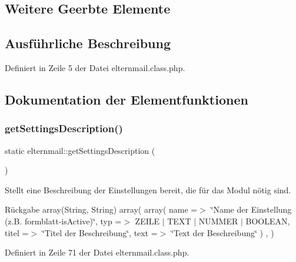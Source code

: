 \subsection*{Weitere Geerbte Elemente}


\subsection{Ausführliche Beschreibung}


Definiert in Zeile 5 der Datei elternmail.\+class.\+php.



\subsection{Dokumentation der Elementfunktionen}
\mbox{\label{classelternmail_ac73aa636b2a565daf700b8acda0c7a46}} 
\subsubsection{\texorpdfstring{get\+Settings\+Description()}{getSettingsDescription()}}
{\footnotesize\ttfamily static elternmail\+::get\+Settings\+Description (\begin{DoxyParamCaption}{ }\end{DoxyParamCaption})\hspace{0.3cm}{\ttfamily [static]}}

Stellt eine Beschreibung der Einstellungen bereit, die für das Modul nötig sind. \begin{DoxyReturn}{Rückgabe}
array(\+String, String) array( array( \textquotesingle{}name\textquotesingle{} =$>$ \char`\"{}\+Name der Einstellung (z.\+B. formblatt-\/is\+Active)\char`\"{}, \textquotesingle{}typ\textquotesingle{} =$>$ Z\+E\+I\+LE $\vert$ T\+E\+XT $\vert$ N\+U\+M\+M\+ER $\vert$ B\+O\+O\+L\+E\+AN, \textquotesingle{}titel\textquotesingle{} =$>$ \char`\"{}\+Titel der Beschreibung\char`\"{}, \textquotesingle{}text\textquotesingle{} =$>$ \char`\"{}\+Text der Beschreibung\char`\"{} ) , ) 
\end{DoxyReturn}


Definiert in Zeile 71 der Datei elternmail.\+class.\+php.

\mbox{\label{classelternmail_a774a4cb2000dd8ee594d238716d27639}} 
